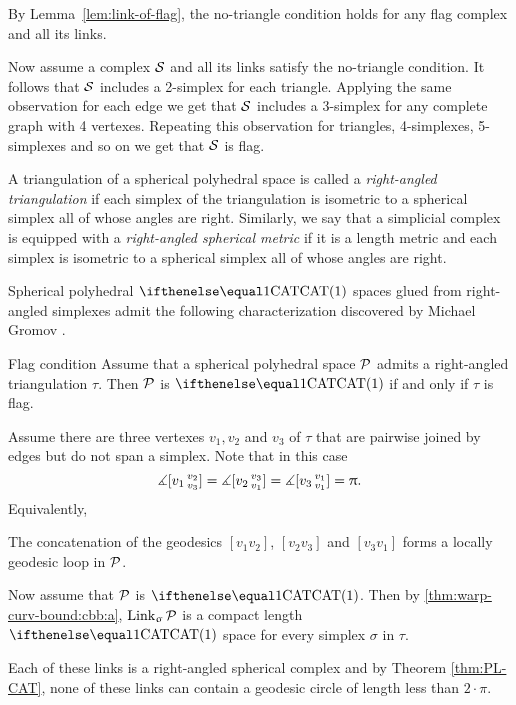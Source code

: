 By Lemma~\ref{lem:link-of-flag}, the no-triangle condition holds 
for any flag complex and all its links.

Now assume a complex $\mathcal{S}$ and all its links satisfy 
the no-triangle condition.
It follows that $\mathcal{S}$ includes a 2-simplex for each triangle.
Applying the same observation for each edge we get that $\mathcal{S}$ 
includes a 3-simplex for any complete graph with 4 vertexes.
Repeating this observation 
for triangles, 
4-simplexes,
5-simplexes
and so on we get that $\mathcal{S}$ is flag.
\qeds


A triangulation of a spherical polyhedral space 
is called a \emph{right-angled triangulation} 
if each simplex of the triangulation is isometric 
to a spherical simplex all of whose angles are right.
Similarly, we say that a simplicial complex 
is equipped with a \emph{right-angled spherical metric}
if it is a length metric and each simplex is isometric 
to a spherical simplex all of whose angles are right.

Spherical polyhedral $\CAT1$ spaces glued from right-angled simplexes
admit the following characterization 
discovered by Michael Gromov \cite[p. 122]{gromov:hyp-groups}.

\begin{thm}{Flag condition}\label{thm:flag}
Assume that a spherical polyhedral space $\mathcal{P}$
admits a right-angled triangulation $\tau$.
Then $\mathcal{P}$ is $\CAT1$
if and only if $\tau$ is flag.
\end{thm}

Assume there are three vertexes $v_1,v_2$ and $v_3$ of $\tau$
that are pairwise joined by edges 
but do not span a simplex.
Note that in this case 
$$\measuredangle[v_1\,{}^{v_2}_{v_3}]=\measuredangle[v_2\,{}^{v_3}_{v_1}]=\measuredangle[v_3\,{}^{v_1}_{v_1}]=\uppi.$$
Equivalently,
\begin{clm}{}\label{clm:3pi/2}
The concatenation of the geodesics $[v_1v_2]$, $[v_2v_3]$ and $[v_3v_1]$
forms a locally geodesic loop in $\mathcal{P}$. 
\end{clm}

Now assume that $\mathcal{P}$ is $\CAT1$.
Then by \ref{thm:warp-curv-bound:cbb:a},
$\mathop{\rm Link}\nolimits_\upsigma\mathcal{P}$ is a compact length $\CAT1$ space for every simplex $\sigma$ 
in $\tau$. 

Each of these links is a right-angled spherical complex
and
by Theorem \ref{thm:PL-CAT}, 
none
of these links can contain a geodesic circle of length less than $2\cdot\pi$. 

